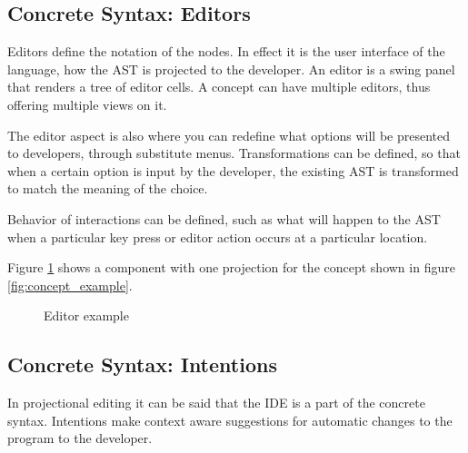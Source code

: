 \subsection{Concrete Syntax: Editors}
Editors define the notation of the nodes.
In effect it is the user interface of the language, how the AST is projected to the developer.
An editor is a swing panel that renders a tree of editor cells.
A concept can have multiple editors, thus offering multiple views on it.

The editor aspect is also where you can redefine what options will be presented to developers, through substitute menus.
Transformations can be defined, so that when a certain option is input by the developer, the existing AST is transformed to match the meaning of the choice.

Behavior of interactions can be defined, such as what will happen to the AST when a particular key press or editor action occurs at a particular location.

Figure \ref{fig:editor_example} shows a component with one projection for the concept shown in figure \ref{fig:concept_example}.
\begin{figure}[h]
    \centering
    \caption{Editor example}
    \label{fig:editor_example}
\end{figure}
 

\subsection{Concrete Syntax: Intentions}
In projectional editing it can be said that the IDE is a part of the concrete syntax.
Intentions make context aware suggestions for automatic changes to the program to the developer.

